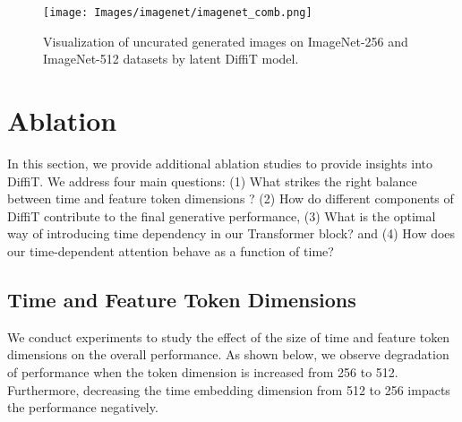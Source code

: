 \begin{figure*}
\centering\texttt{[image: Images/imagenet/imagenet\_comb.png]}
\caption{Visualization of uncurated generated images on ImageNet-256 and ImageNet-512 datasets by latent DiffiT model.}\label{fig:imagenet-256
}
\label{fig:imagenet-256}
\end{figure*}

\section{Ablation}
\label{sec:ablation}
In this section, we provide additional ablation studies to provide insights into DiffiT. We address four main questions: (1) What strikes the right balance between time and feature token dimensions ? (2) How do different components of DiffiT contribute to the final generative performance, (3) What is the optimal way of introducing time dependency in our Transformer block? and (4) How does our time-dependent attention behave as a function of time?

\subsection{Time and Feature Token Dimensions}
\label{sec:abl-effect-time}
We conduct experiments to study the effect of the size of time and feature token dimensions on the overall performance. As shown below, we observe degradation of performance when the token dimension is increased from 256 to 512. Furthermore, decreasing the time embedding dimension from 512 to 256 impacts the performance negatively. 

\begin{table}
\centering
{}
    \caption{Ablation study on the effectiveness of time and feature dimensions.}
    \label{tab:abl-1-time}
\end{table}

